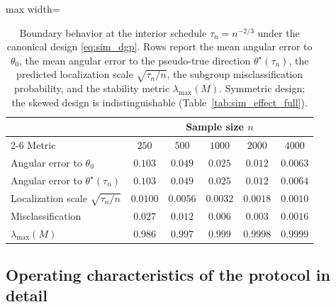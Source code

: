 \documentclass[11pt]{article}
\theoremstyle{definition}
\theoremstyle{plain}
\begin{document}
\begin{table}[!htbp]
  \centering
  \caption{Boundary behavior at the interior schedule $\tau_n=n^{-2/3}$ under the canonical design \eqref{eq:sim_dgp}. Rows report the mean angular error to $\theta_0$, the mean angular error to the pseudo-true direction $\theta^\star(\tau_n)$, the predicted localization scale $\sqrt{\tau_n/n}$, the subgroup misclassification probability, and the stability metric $\lambda_{\max}(M)$. Symmetric design; the skewed design is indistinguishable (Table~\ref{tab:sim_effect_full}).}
  \label{tab:sim_boundary}
  \begin{adjustbox}{max width=\textwidth}
  \begin{tabular}{lccccc}
    \toprule
    & \multicolumn{5}{c}{Sample size $n$}\\
    \cmidrule(lr){2-6}
    Metric & $250$ & $500$ & $1000$ & $2000$ & $4000$\\
    \midrule
    Angular error to $\theta_0$ & $0.103$ & $0.049$ & $0.025$ & $0.012$ & $0.0063$\\
    Angular error to $\theta^\star(\tau_n)$ & $0.103$ & $0.049$ & $0.025$ & $0.012$ & $0.0064$\\
    Localization scale $\sqrt{\tau_n/n}$ & $0.0100$ & $0.0056$ & $0.0032$ & $0.0018$ & $0.0010$\\
    Misclassification & $0.027$ & $0.012$ & $0.006$ & $0.003$ & $0.0016$\\
    $\lambda_{\max}(M)$ & $0.986$ & $0.997$ & $0.999$ & $0.9998$ & $0.9999$\\
    \bottomrule
  \end{tabular}
  \end{adjustbox}
\end{table}

\subsection{Operating characteristics of the protocol in detail}
\end{document}
